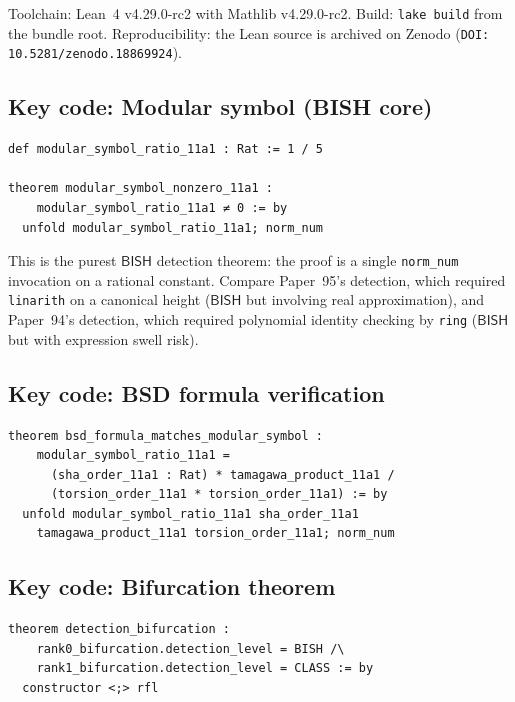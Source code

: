 \documentclass[11pt]{article}
\theoremstyle{plain}
\theoremstyle{definition}
\theoremstyle{remark}
\newcommand{\BISH}{\ensuremath{\mathsf{BISH}}}
\begin{document}
Toolchain: Lean~4 v4.29.0-rc2 with Mathlib v4.29.0-rc2. Build: \texttt{lake build} from the bundle root. Reproducibility: the Lean source is archived on Zenodo (\texttt{DOI: 10.5281/zenodo.18869924}).

\subsection{Key code: Modular symbol (BISH core)}

\begin{lstlisting}[style=leanstyle,caption={The rank-0 detection theorem (ModularSymbol.lean).}]
def modular_symbol_ratio_11a1 : Rat := 1 / 5

theorem modular_symbol_nonzero_11a1 :
    modular_symbol_ratio_11a1 ≠ 0 := by
  unfold modular_symbol_ratio_11a1; norm_num
\end{lstlisting}

This is the purest $\BISH$ detection theorem: the proof is a single \texttt{norm\_num} invocation on a rational constant. Compare Paper~95's detection, which required \texttt{linarith} on a canonical height ($\BISH$ but involving real approximation), and Paper~94's detection, which required polynomial identity checking by \texttt{ring} ($\BISH$ but with expression swell risk).

\subsection{Key code: BSD formula verification}

\begin{lstlisting}[style=leanstyle,caption={BSD formula check (BSDRank0.lean).}]
theorem bsd_formula_matches_modular_symbol :
    modular_symbol_ratio_11a1 =
      (sha_order_11a1 : Rat) * tamagawa_product_11a1 /
      (torsion_order_11a1 * torsion_order_11a1) := by
  unfold modular_symbol_ratio_11a1 sha_order_11a1
    tamagawa_product_11a1 torsion_order_11a1; norm_num
\end{lstlisting}

\subsection{Key code: Bifurcation theorem}

\begin{lstlisting}[style=leanstyle,caption={Root number bifurcation (Bifurcation.lean).}]
theorem detection_bifurcation :
    rank0_bifurcation.detection_level = BISH /\
    rank1_bifurcation.detection_level = CLASS := by
  constructor <;> rfl
\end{lstlisting}
\end{document}
